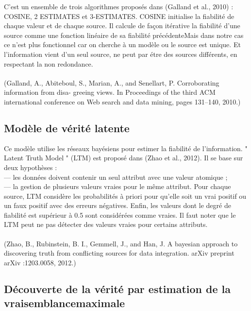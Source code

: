 \documentclass[12pt]{report}
\begin{document}
C’est un ensemble de trois algorithmes proposés dans (Galland et al.,
2010) : COSINE, 2 ESTIMATES et 3-ESTIMATES. COSINE initialise la
fiabilité de chaque valeur et de chaque source. Il calcule de façon itérative
la fiabilité d’une source comme une fonction linéaire de sa fiabilité
précédenteMais dans notre cas ce n’est plus fonctionnel car on cherche à
un modèle ou le source est unique. Et l’information vient d’un seul source,
ne peut par étre des sources différents, en respectant la non redondance.
\\ \\(Galland, A., Abiteboul, S., Marian, A., and Senellart, P. Corroborating
information from disa- greeing views. In Proceedings of the third ACM
international conference on Web search and data mining, pages 131–140,
2010.)

\subsection{Modèle de vérité latente}

Ce modèle utilise les réseaux bayésiens pour estimer la fiabilité de
l’information. " Latent Truth Model " (LTM) est proposé dans (Zhao et al.,
2012). Il se base sur deux hypothèses :
\\— les données doivent contenir un seul attribut avec une valeur atomique ;
\\— la gestion de plusieurs valeurs vraies pour le même attribut.
Pour chaque source, LTM considère les probabilités à priori pour qu’elle
soit un vrai positif ou un faux positif avec des erreurs négatives. Enfin, les
valeurs dont le degré de fiabilité est supérieur à 0.5 sont considérées
comme vraies. Il faut noter que le LTM peut ne pas détecter des valeurs
vraies pour certains attributs.\\ \\(Zhao, B., Rubinstein, B. I., Gemmell, J., and Han, J. A bayesian approach
to discovering truth from conflicting sources for data integration. arXiv
preprint arXiv :1203.0058, 2012.)

\subsection{Découverte de la vérité par estimation de la vraisemblancemaximale}
\end{document}
